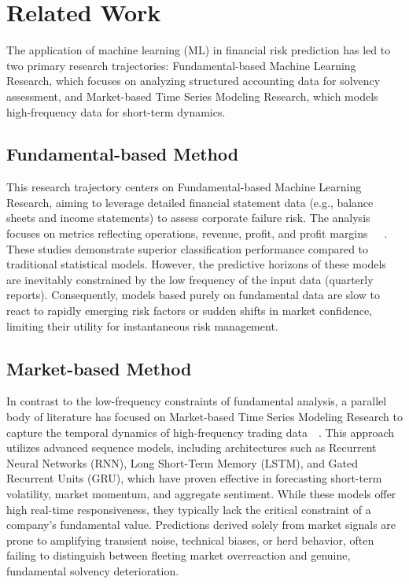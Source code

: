 \section{Related Work}
\label{sec:related work}
The application of machine learning (ML) in financial risk prediction has led to two primary research trajectories: Fundamental-based Machine Learning Research, which focuses on analyzing structured accounting data for solvency assessment, and Market-based Time Series Modeling Research, which models high-frequency data for short-term dynamics.

\subsection{Fundamental-based Method}
This research trajectory centers on Fundamental-based Machine Learning Research, aiming to leverage detailed financial statement data (e.g., balance sheets and income statements) to assess corporate failure risk. The analysis focuses on metrics reflecting operations, revenue, profit, and profit margins~\cite{gu2020empirical}~\cite{ahbali2022identifying}~\cite{wang2023sparsity}. These studies demonstrate superior classification performance compared to traditional statistical models. However, the predictive horizons of these models are inevitably constrained by the low frequency of the input data (quarterly reports). Consequently, models based purely on fundamental data are slow to react to rapidly emerging risk factors or sudden shifts in market confidence, limiting their utility for instantaneous risk management.

\subsection{Market-based Method}
In contrast to the low-frequency constraints of fundamental analysis, a parallel body of literature has focused on Market-based Time Series Modeling Research to capture the temporal dynamics of high-frequency trading data~\cite{random_forest}~\cite{svm}. This approach utilizes advanced sequence models, including architectures such as Recurrent Neural Networks (RNN), Long Short-Term Memory (LSTM), and Gated Recurrent Units (GRU), which have proven effective in forecasting short-term volatility, market momentum, and aggregate sentiment. While these models offer high real-time responsiveness, they typically lack the critical constraint of a company's fundamental value. Predictions derived solely from market signals are prone to amplifying transient noise, technical biases, or herd behavior, often failing to distinguish between fleeting market overreaction and genuine, fundamental solvency deterioration.

